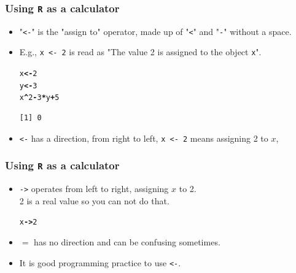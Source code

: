 \documentclass[handout]{beamer}\usepackage[]{graphicx}\usepackage[]{color}
\makeatletter
\newcommand{\hlnum}[1]{\textcolor[rgb]{0.533,0,0.133}{#1}}%
\newcommand{\hlopt}[1]{\textcolor[rgb]{0,0,0}{\textbf{#1}}}%
\newcommand{\hlstd}[1]{\textcolor[rgb]{0,0,0}{#1}}%
\newcommand{\hlkwb}[1]{\textcolor[rgb]{0,0,0.4}{\textbf{#1}}}%
\newenvironment{kframe}{%
 \def\at@end@of@kframe{}%
 \ifinner\ifhmode%
  \def\at@end@of@kframe{\end{minipage}}%
  \begin{minipage}{\columnwidth}%
 \fi\fi%
 \def\FrameCommand##1{\hskip\@totalleftmargin \hskip-\fboxsep
 \colorbox{shadecolor}{##1}\hskip-\fboxsep
     \hskip-\linewidth \hskip-\@totalleftmargin \hskip\columnwidth}%
 \MakeFramed {\advance\hsize-\width
   \@totalleftmargin\z@ \linewidth\hsize
   \@setminipage}}%
 {\par\unskip\endMakeFramed%
 \at@end@of@kframe}
\newenvironment{knitrout}{}{} %
\makeatother
\begin{document}
\begin{frame}[fragile]
  \frametitle{Using \texttt{R} as a calculator}
  \begin{itemize}
  \item "\verb|<-|" is the "assign to" operator, made up of "\verb|<|" and "\verb|-|" without a space.
  \item E.g., \verb|x <- 2| is read as "The value 2 is assigned to the object \verb|x|".
\begin{knitrout}
\color{fgcolor}\begin{kframe}
\begin{alltt}
\hlstd{x} \hlkwb{<-} \hlnum{2}
\hlstd{y} \hlkwb{<-} \hlnum{3}
\hlstd{x}\hlopt{^}\hlnum{2} \hlopt{-} \hlnum{3}\hlopt{*}\hlstd{y} \hlopt{+} \hlnum{5}
\end{alltt}
\begin{verbatim}
[1] 0
\end{verbatim}
\end{kframe}
\end{knitrout}
\item \verb|<-| has a direction, from right to left, \verb|x <- 2| means
  assigning 2 to $x$,
\end{itemize}
\end{frame}


\begin{frame}[fragile]
  \frametitle{Using \texttt{R} as a calculator}
  \begin{itemize}
\item \verb|->| operates from left to right, assigning $x$ to 2. \\
2 is a real value so you can not do that.
\begin{knitrout}
\color{fgcolor}\begin{kframe}
\begin{alltt}
\hlstd{x} \hlkwb{->} \hlnum{2}
\end{alltt}


{\ttfamily\noindent\bfseries\color{errorcolor}{Error in 2 <- x: invalid (do\_set) left-hand side to assignment}}\end{kframe}
\end{knitrout}
\item $=$ has no direction and can be confusing sometimes.
\item It is good programming practice to use \verb|<-|.
\end{itemize}
\end{frame}
\end{document}
